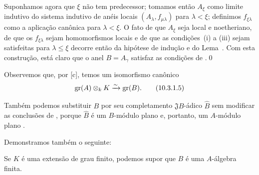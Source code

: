 \begin{env}[10.3.1.4]
Suponhamos agora que $\xi$ não tem predecessor;
tomamos então $A_\xi$ como limite indutivo do sistema indutivo de anéis locais $(A_\lambda,f_{\mu\lambda})$ para $\lambda<\xi$;
definimos $f_{\xi\lambda}$ como a aplicação canônica para $\lambda<\xi$.
O fato de que $A_\xi$ seja local e noetheriano, de que os $f_{\xi\lambda}$ sejam homomorfismos locais e de que as condições~(i) a (iii) sejam satisfeitas para $\lambda\leq\xi$
decorre então da hipótese de indução e do Lema~.
Com esta construção, está claro que o anel $B=A_\gamma$ satisfaz as condições de .\qed
\end{env}

Observemos que, por [c], temos um isomorfismo canônico
\[
\label{0.10.3.1.5}
  \gr(A)\otimes_k K\simto\gr(B).
  \tag{10.3.1.5}
\]

Também podemos substituir $B$ por seu completamento $\mathfrak{J}B$-ádico $\widehat{B}$ sem modificar as conclusões de , porque $\widehat{B}$ é um $B$-módulo plano  e, portanto, um $A$-módulo plano .

Demonstramos também o seguinte:
\begin{corollary}[10.3.2]
\label{0.10.3.2}
Se $K$ é uma extensão de grau finito, podemos supor que $B$ é uma $A$-álgebra finita.
\end{corollary}
